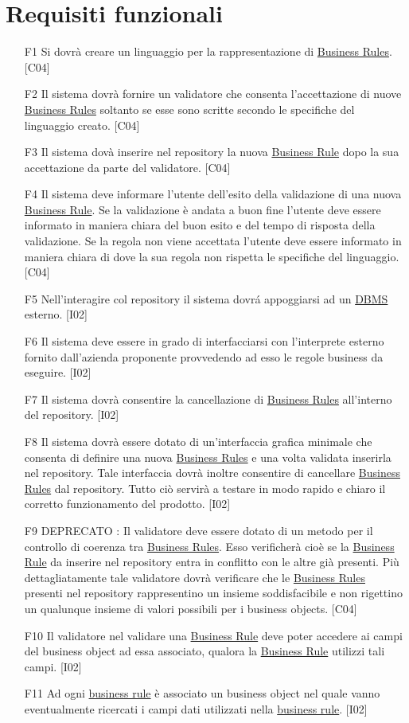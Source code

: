 \section{Requisiti funzionali}
\begin{itemize}
\item[F1]{Si dovr\`a creare un linguaggio per la rappresentazione di \underline{Business Rules}. [C04]}
\item[F2]{Il sistema dovr\`a fornire un validatore che consenta l'accettazione di nuove \underline{Business Rules} soltanto se esse sono scritte secondo le specifiche del linguaggio creato. [C04]}
\item[F3]{Il sistema dov\`a inserire nel repository la nuova \underline{Business Rule} dopo la sua accettazione da parte del validatore. [C04]}
\item[F4]{Il sistema deve informare l'utente dell'esito della validazione di una nuova \underline{Business Rule}. Se la validazione \`e andata a buon fine l'utente deve essere informato in maniera chiara del buon esito e del tempo di risposta della validazione. Se la regola non viene accettata l'utente deve essere informato in maniera chiara di dove la sua regola non rispetta le specifiche del linguaggio. [C04]}
\item[F5]{Nell'interagire col repository il sistema dovr\'a appoggiarsi ad un \underline{DBMS} esterno. [I02]}
\item[F6]{Il sistema deve essere in grado di interfacciarsi con l'interprete esterno fornito dall'azienda proponente provvedendo ad esso le regole business da eseguire. [I02]}
\item[F7]{Il sistema dovr\`a consentire la cancellazione di \underline{Business Rules} all'interno del repository. [I02]}
\item[F8]{Il sistema dovr\`a essere dotato di un'interfaccia grafica minimale che consenta di definire una nuova \underline{Business Rules} e una volta validata inserirla nel repository. Tale interfaccia dovr\`a inoltre consentire di cancellare \underline{Business Rules} dal repository. Tutto ci\`o servir\`a a testare in modo rapido e chiaro il corretto funzionamento del prodotto. [I02]}
\item[F9]{ DEPRECATO : Il validatore deve essere dotato di un metodo per il controllo di coerenza tra \underline{Business Rules}. Esso verificher\`a cio\`e se la \underline{Business Rule} da inserire nel repository entra in conflitto con le altre gi\`a presenti. Pi\`u dettagliatamente tale validatore dovr\`a verificare che le \underline{Business Rules} presenti nel repository rappresentino un insieme soddisfacibile e non rigettino un qualunque insieme di valori possibili per i business objects. [C04]}
\item[F10]{Il validatore nel validare una \underline{Business Rule} deve poter accedere ai campi del business object ad essa associato, qualora la \underline{Business Rule} utilizzi tali campi. [I02]}
\item[F11]{Ad ogni \underline{business rule} \`e associato un business object nel quale vanno eventualmente ricercati i campi dati utilizzati nella \underline{business rule}. [I02]}
\end{itemize}

